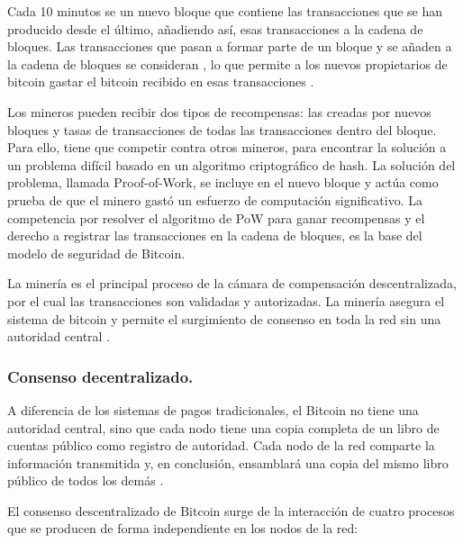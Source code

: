 \vspace{5mm}

\noindent Cada 10 minutos se  un nuevo bloque que contiene las transacciones que se han producido desde el 
último, añadiendo así, esas transacciones a la cadena de bloques. Las transacciones que pasan a formar parte de un bloque 
y se añaden a la cadena de bloques se consideran , lo que permite a los nuevos propietarios de bitcoin 
gastar el bitcoin recibido en esas transacciones \cite{antonopoulos2014mastering}.

\vspace{5mm}

\noindent Los mineros pueden recibir dos tipos de recompensas: las creadas por nuevos bloques y tasas de transacciones 
de todas las transacciones dentro del bloque. Para ello, tiene que competir contra otros mineros, para encontrar la 
solución a un problema difícil basado en un algoritmo criptográfico de hash. La solución del problema, llamada 
Proof-of-Work, se incluye en el nuevo bloque y actúa como prueba de que el minero gastó un esfuerzo de computación 
significativo. La competencia por resolver el algoritmo de PoW para ganar recompensas y el derecho a registrar las 
transacciones en la cadena de bloques, es la base del modelo de seguridad de Bitcoin.

\vspace{5mm}

\noindent La minería es el principal proceso de la cámara de compensación descentralizada, por el cual las transacciones 
son validadas y autorizadas. La minería asegura el sistema de bitcoin y permite el surgimiento de consenso en toda la 
red sin una autoridad central \cite{antonopoulos2014mastering}.

\subsubsection*{Consenso decentralizado.}

A diferencia de los sistemas de pagos tradicionales, el Bitcoin no tiene una autoridad central, sino que cada nodo tiene
una copia completa de un libro de cuentas público como registro de autoridad. Cada nodo de la red comparte la 
información transmitida y, en conclusión, ensamblará una copia del mismo libro público de todos los demás 
\cite{antonopoulos2014mastering}.

\vspace{5mm}

\noindent El consenso descentralizado de Bitcoin surge de la interacción de cuatro procesos que se producen de forma 
independiente en los nodos de la red:


